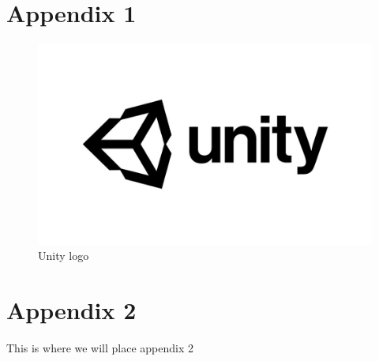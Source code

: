 \documentclass[12pt,a4paper,twoside,openright]{report}
\begin{document}
\cleardoublepage
{}



\cleardoublepage
\begin{appendices}
    \setcounter{page}{1}
    \chapter{Appendix 1}
        \begin{figure}[H]
            \centering
            \includegraphics[scale=0.2]{appendix/Unity.jpg}
            \caption{Unity logo}
            \label{fig:unity}
        \end{figure}

    \chapter{Appendix 2}
        This is where we will place appendix 2
\end{appendices}
\end{document}
